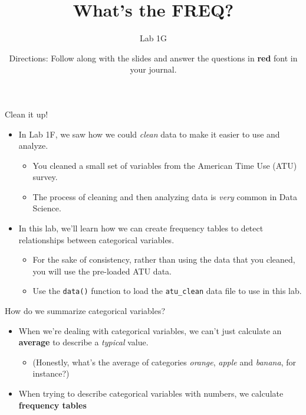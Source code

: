 \documentclass[
  ignorenonframetext,
]{beamer}
\title{What's the FREQ?}
\author{Lab 1G}
\date{Directions: Follow along with the slides and answer the questions in
\textbf{red} font in your journal.}
\providecommand{\tightlist}{%
  \setlength{\itemsep}{0pt}\setlength{\parskip}{0pt}}
\begin{document}
\frame{\titlepage}

\begin{frame}[fragile]{Clean it up!}
\protect\hypertarget{clean-it-up}{}

\begin{itemize}
\tightlist
\item
  In Lab 1F, we saw how we could \emph{clean} data to make it easier to
  use and analyze.

  \begin{itemize}
  \tightlist
  \item
    You cleaned a small set of variables from the American Time Use
    (ATU) survey.
  \item
    The process of cleaning and then analyzing data is \emph{very}
    common in Data Science.
  \end{itemize}
\item
  In this lab, we'll learn how we can create frequency tables to detect
  relationships between categorical variables.

  \begin{itemize}
  \tightlist
  \item
    For the sake of consistency, rather than using the data that you
    cleaned, you will use the pre-loaded ATU data.
  \item
    Use the \texttt{data()} function to load the \texttt{atu\_clean}
    data file to use in this lab.
  \end{itemize}
\end{itemize}

\end{frame}

\begin{frame}{How do we summarize categorical variables?}
\protect\hypertarget{how-do-we-summarize-categorical-variables}{}

\begin{itemize}
\tightlist
\item
  When we're dealing with categorical variables, we can't just calculate
  an \textbf{average} to describe a \emph{typical} value.

  \begin{itemize}
  \tightlist
  \item
    (Honestly, what's the average of categories \emph{orange},
    \emph{apple} and \emph{banana}, for instance?)
  \end{itemize}
\item
  When trying to describe categorical variables with numbers, we
  calculate \textbf{frequency tables}
\end{itemize}

\end{frame}
\end{document}
